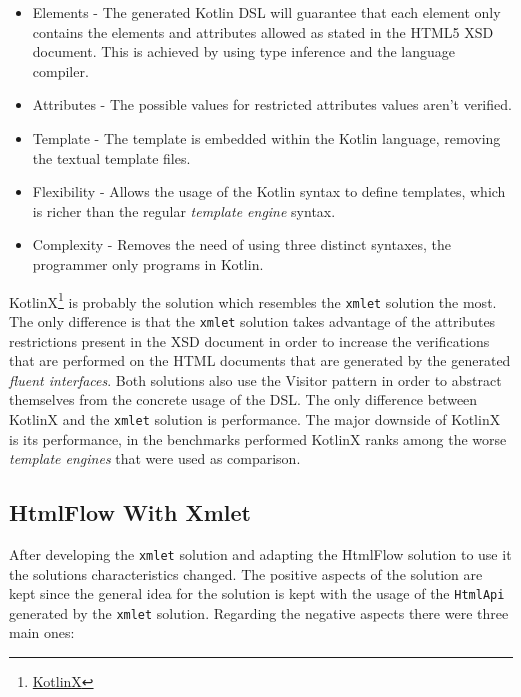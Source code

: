 \begin{itemize}
	\item Elements - The generated Kotlin \ac{DSL} will guarantee that each element only contains the elements and attributes allowed as stated in the \ac{HTML}5 \ac{XSD} document. This is achieved by using type inference and the language compiler.
	\item Attributes - The possible values for restricted attributes values aren't verified.
	\item Template - The template is embedded within the Kotlin language, removing the textual template files.
	\item Flexibility - Allows the usage of the Kotlin syntax to define templates, which is richer than the regular \textit{template engine} syntax.
	\item Complexity - Removes the need of using three distinct syntaxes, the programmer only programs in Kotlin.
\end{itemize}

\noindent
KotlinX\footnote{\href{https://github.com/Kotlin/kotlinx.coroutines}{KotlinX}} is probably the solution which resembles the \texttt{xmlet} solution the most. The only difference is that the \texttt{xmlet} solution takes advantage of the attributes restrictions present in the \ac{XSD} document in order to increase the verifications that are performed on the \ac{HTML} documents that are generated by the generated \textit{fluent interfaces}. Both solutions also use the Visitor pattern in order to abstract themselves from the concrete usage of the \ac{DSL}. The only difference between KotlinX and the \texttt{xmlet} solution is performance. The major downside of KotlinX is its performance, in the benchmarks performed KotlinX ranks among the worse \textit{template engines} that were used as comparison.

\subsection{HtmlFlow With Xmlet}
\label{sec:htmlflowwithxmlet}

After developing the \texttt{xmlet} solution and adapting the HtmlFlow solution to use it the solutions characteristics changed. The positive aspects of the solution are kept since the general idea for the solution is kept with the usage of the \texttt{HtmlApi} generated by the \texttt{xmlet} solution. Regarding the negative aspects there were three main ones:

